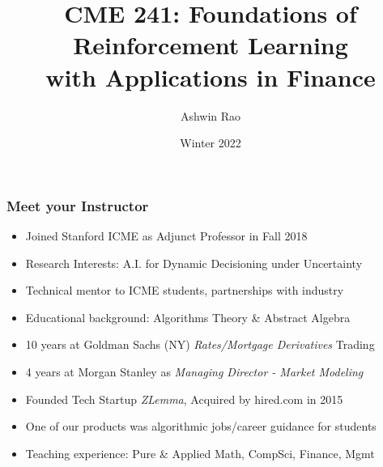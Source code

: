 \documentclass[handout]{beamer}
\title[``RL for Finance'' course]{CME 241: Foundations of Reinforcement Learning \\ with Applications in Finance} %
\author{Ashwin Rao} %
\institute[Stanford] %
{ICME, Stanford University
}
\date{Winter 2022} %
\begin{document}
\begin{frame}
\titlepage %
\end{frame}


\begin{frame}
\frametitle{Meet your Instructor}
\pause
\begin{itemize}[<+->]
\item Joined Stanford ICME as Adjunct Professor in Fall 2018
\item Research Interests: A.I. for Dynamic Decisioning under Uncertainty
\item Technical mentor to ICME students, partnerships with industry
\item Educational background: Algorithms Theory \& Abstract Algebra
\item 10 years at Goldman Sachs (NY) {\em Rates/Mortgage Derivatives} Trading
\item 4 years at Morgan Stanley as {\em Managing Director - Market Modeling}
\item Founded Tech Startup {\em ZLemma}, Acquired by hired.com in 2015
\item One of our products was algorithmic jobs/career guidance for students
\item Teaching experience: Pure \& Applied Math, CompSci, Finance, Mgmt
\end{itemize}
\end{frame}
\end{document}
